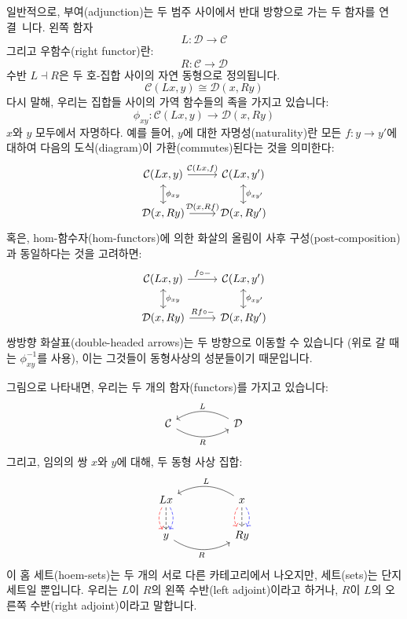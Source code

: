 \documentclass[DaoFP]{subfiles}
\begin{document}
일반적으로, 부여(adjunction)는 두 범주 사이에서 반대 방향으로 가는 두 함자를 연결~니다. 왼쪽 함자
\[ L \colon \mathcal{D} \to \mathcal{C}\]
그리고 우함수(right functor)란:
\[ R \colon \mathcal{C} \to  \mathcal{D} \]
수반 $L \dashv R$은 두 호-집합 사이의 자연 동형으로 정의됩니다.
\[  \mathcal{C} (L x, y) \cong \mathcal{D}( x , R y)\]
다시 말해, 우리는 집합들 사이의 가역 함수들의 족을 가지고 있습니다:
\[ \phi_{x y} \colon  \mathcal{C} (L x, y) \to \mathcal{D}( x , R y) \]
$x$와 $y$ 모두에서 자명하다. 예를 들어, $y$에 대한 자명성(naturality)란 모든 $f \colon y \to y'$에 대하여 다음의 도식(diagram)이 가환(commutes)된다는 것을 의미한다:
\[
 \begin{tikzcd}
 \mathcal{C}(L x, y)
 \arrow[d, leftrightarrow, "\phi_{x y}"]
 \arrow[r, "{\mathcal{C}(L x, f)}"]
 &
 \mathcal{C}(L x, y')
  \arrow[d, leftrightarrow, "\phi_{x y'}"]
 \\
 \mathcal{D}(x, R y)
 \arrow[r, "{\mathcal{D}(x, R f)}"]
& \mathcal{D}(x, R y')
 \end{tikzcd}
\]
혹은, hom-함수자(hom-functors)에 의한 화살의 올림이 사후 구성(post-composition)과 동일하다는 것을 고려하면:
\[
 \begin{tikzcd}
 \mathcal{C}(L x, y)
 \arrow[d, leftrightarrow, "\phi_{x y}"]
 \arrow[r, "f \circ -"]
 &
 \mathcal{C}(L x, y')
  \arrow[d, leftrightarrow, "\phi_{x y'}"]
 \\
 \mathcal{D}(x, R y)
 \arrow[r, "R f \circ -"]
& \mathcal{D}(x, R y')
 \end{tikzcd}
\]
쌍방향 화살표(double-headed arrows)는 두 방향으로 이동할 수 있습니다 (위로 갈 때는 $\phi^{-1}_{x y}$를 사용), 이는 그것들이 동형사상의 성분들이기 때문입니다.


그림으로 나타내면, 우리는 두 개의 함자(functors)를 가지고 있습니다:
\[
 \begin{tikzcd}
  \mathcal{C}
  \arrow[rr, bend right, "R"']
  &&
  \mathcal{D}
  \arrow[ll, bend right, "L"']
  \end{tikzcd}
\]
그리고, 임의의 쌍 $x$와 $y$에 대해, 두 동형 사상 집합:
\[
 \begin{tikzcd}
L x
\arrow[d, bend right, red, dashed]
\arrow[d, dashed]
\arrow[d, bend left, blue, dashed]
  &&
  x
\arrow[d, bend right, red, dashed]
\arrow[d, dashed]
\arrow[d, bend left, blue, dashed]
 \arrow[ll, bend right, "L"']
 \\
y
   \arrow[rr, bend right, "R"']
 &&
 R y
  \end{tikzcd}
\]
이 홈 세트(hoem-sets)는 두 개의 서로 다른 카테고리에서 나오지만, 세트(sets)는 단지 세트일 뿐입니다. 우리는 $L$이 $R$의 왼쪽 수반(left adjoint)이라고 하거나, $R$이 $L$의 오른쪽 수반(right adjoint)이라고 말합니다.
\end{document}
